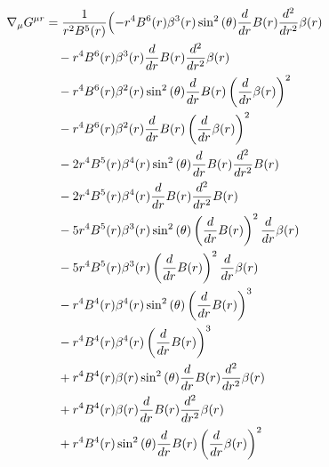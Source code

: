 \documentclass[11pt,a4paper]{article}
\begin{document}
\begin{align*}
  \nabla_\mu G^{\mu r} &= \frac{1}{r^{2} B^{5}{\left(r \right)}}\Bigl(- r^{4} B^{6}{\left(r \right)} \beta^{3}{\left(r \right)} \sin^{2}{\left(\theta \right)} \frac{d}{d r} B{\left(r \right)} \frac{d^{2}}{d r^{2}} \beta{\left(r \right)} \\
  &\quad - r^{4} B^{6}{\left(r \right)} \beta^{3}{\left(r \right)} \frac{d}{d r} B{\left(r \right)} \frac{d^{2}}{d r^{2}} \beta{\left(r \right)} \\
  &\quad - r^{4} B^{6}{\left(r \right)} \beta^{2}{\left(r \right)} \sin^{2}{\left(\theta \right)} \frac{d}{d r} B{\left(r \right)} \left(\frac{d}{d r} \beta{\left(r \right)}\right)^{2} \\
  &\quad - r^{4} B^{6}{\left(r \right)} \beta^{2}{\left(r \right)} \frac{d}{d r} B{\left(r \right)} \left(\frac{d}{d r} \beta{\left(r \right)}\right)^{2} \\
  &\quad - 2 r^{4} B^{5}{\left(r \right)} \beta^{4}{\left(r \right)} \sin^{2}{\left(\theta \right)} \frac{d}{d r} B{\left(r \right)} \frac{d^{2}}{d r^{2}} B{\left(r \right)} \\
  &\quad - 2 r^{4} B^{5}{\left(r \right)} \beta^{4}{\left(r \right)} \frac{d}{d r} B{\left(r \right)} \frac{d^{2}}{d r^{2}} B{\left(r \right)} \\
  &\quad - 5 r^{4} B^{5}{\left(r \right)} \beta^{3}{\left(r \right)} \sin^{2}{\left(\theta \right)} \left(\frac{d}{d r} B{\left(r \right)}\right)^{2} \frac{d}{d r} \beta{\left(r \right)} \\
  &\quad - 5 r^{4} B^{5}{\left(r \right)} \beta^{3}{\left(r \right)} \left(\frac{d}{d r} B{\left(r \right)}\right)^{2} \frac{d}{d r} \beta{\left(r \right)} \\
  &\quad - r^{4} B^{4}{\left(r \right)} \beta^{4}{\left(r \right)} \sin^{2}{\left(\theta \right)} \left(\frac{d}{d r} B{\left(r \right)}\right)^{3} \\
  &\quad - r^{4} B^{4}{\left(r \right)} \beta^{4}{\left(r \right)} \left(\frac{d}{d r} B{\left(r \right)}\right)^{3} \\
  &\quad + r^{4} B^{4}{\left(r \right)} \beta{\left(r \right)} \sin^{2}{\left(\theta \right)} \frac{d}{d r} B{\left(r \right)} \frac{d^{2}}{d r^{2}} \beta{\left(r \right)} \\
  &\quad + r^{4} B^{4}{\left(r \right)} \beta{\left(r \right)} \frac{d}{d r} B{\left(r \right)} \frac{d^{2}}{d r^{2}} \beta{\left(r \right)} \\
  &\quad + r^{4} B^{4}{\left(r \right)} \sin^{2}{\left(\theta \right)} \frac{d}{d r} B{\left(r \right)} \left(\frac{d}{d r} \beta{\left(r \right)}\right)^{2} \\

\end{align*}
\end{document}
